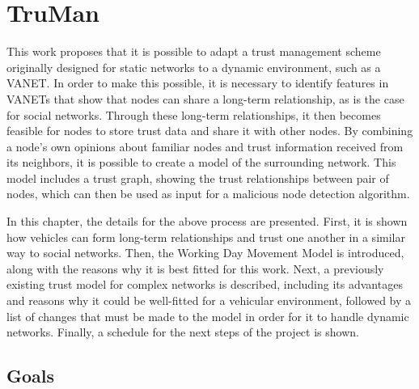 \chapter{TruMan}
\label{chap:truman}

This work proposes that it is possible to adapt a trust management scheme originally designed for static networks to a dynamic environment, such as a VANET.
In order to make this possible, it is necessary to identify features in VANETs that show that nodes can share a long-term relationship, as is the case for social networks.
Through these long-term relationships, it then becomes feasible for nodes to store trust data and share it with other nodes.
By combining a node's own opinions about familiar nodes and trust information received from its neighbors, it is possible to create a model of the surrounding network.
This model includes a trust graph, showing the trust relationships between pair of nodes, which can then be used as input for a malicious node detection algorithm.


In this chapter, the details for the above process are presented.
First, it is shown how vehicles can form long-term relationships and trust one another in a similar way to social networks.
Then, the Working Day Movement Model is introduced, along with the reasons why it is best fitted for this work.
Next, a previously existing trust model for complex networks is described, including its advantages and reasons why it could be well-fitted for a vehicular environment, followed by a list of changes that must be made to the model in order for it to handle dynamic networks.
Finally, a schedule for the next steps of the project is shown.

\section{Goals}
\label{section:goals}

